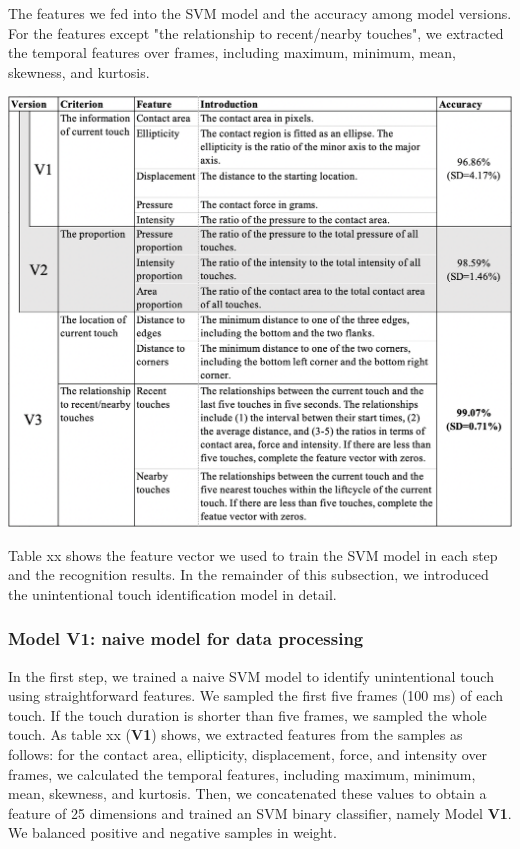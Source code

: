 \begin{table}[!tbh]
	\caption{The features we fed into the SVM model and the accuracy among model versions. For the features except "the relationship to recent/nearby touches", we extracted the temporal features over frames, including maximum, minimum, mean, skewness, and kurtosis.}
	\includegraphics[width=1.0\linewidth]{figures/features.png}
	\centering
	\label{tab:study_features}
\end{table}

Table xx shows the feature vector we used to train the SVM model in each step and the recognition results. In the remainder of this subsection, we introduced the unintentional touch identification model in detail.


\subsubsection{Model  V1: naive model for data processing}

In the first step, we trained a naive SVM model to identify unintentional touch using straightforward features. We sampled the first five frames (100 ms) of each touch. If the touch duration is shorter than five frames, we sampled the whole touch. As table xx (\textbf{V1}) shows, we extracted features from the samples as follows: for the contact area, ellipticity, displacement, force, and intensity over frames, we calculated the temporal features, including maximum, minimum, mean, skewness, and kurtosis. Then, we concatenated these values to obtain a feature of 25 dimensions and trained an SVM binary classifier, namely Model \textbf{V1}. We balanced positive and negative samples in weight.

